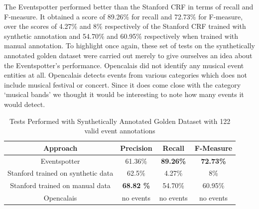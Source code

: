 \documentclass[a4paper,11pt]{report}
\begin{document}
The Eventspotter performed better than the Stanford CRF in terms of recall and F-measure. It obtained a score of 89.26\% for recall and 72.73\% for F-measure, over the scores of 4.27\% and 8\% respectively of the Stanford CRF trained with synthetic annotation and 54.70\% and 60.95\% respectively when trained with manual annotation. To highlight once again, these set of tests on the synthetically annotated golden dataset were carried out merely to give ourselves an idea about the Eventspotter's performance. Opencalais did not identify any musical event entities at all. Opencalais detects events from various categories which does not include musical festival or concert. Since it does come close with the category `musical bands' we thought it would be interesting to note how many events it would detect.
\begin{table}[ht]
\caption{Tests Performed with Synthetically Annotated Golden Dataset with 122 valid event annotations} %
\centering %
\begin{tabular}{c c c c} %
\hline\hline %
Approach & Precision & Recall & F-Measure \\ [0.5ex] %
\hline %
Eventspotter & 61.36\% & \bf 89.26\% \bf & \bf 72.73\% \bf \\ %
Stanford trained on synthetic data & 62.5\% & 4.27\% & 8\%\\
Stanford trained on manual data & \bf 68.82 \bf \% & 54.70\% & 60.95\% \\
Opencalais & no events & no events & no events \\
\hline %
\end{tabular}
\label{table:nonlin} %
\end{table}
\end{document}
